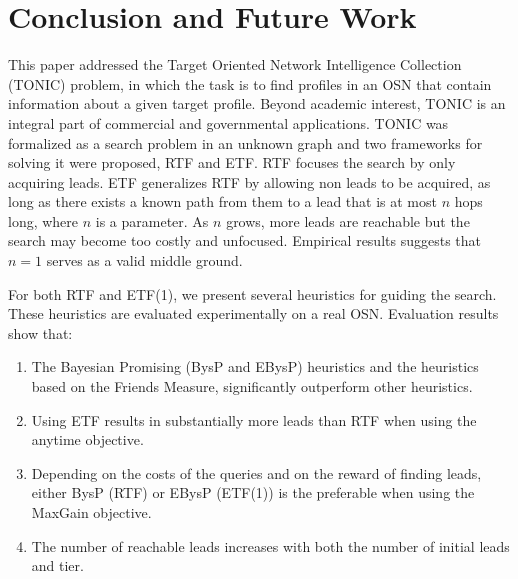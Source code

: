 \documentclass[prodmode,acmtecs]{acmsmall} %
\newcommand{\note}[2]{\textbf{\textsc{#1} says: \textit{#2}}}
\begin{document}
\section{Conclusion and Future Work}
\label{sec:conclusions}


This paper addressed the Target Oriented Network Intelligence Collection (TONIC) problem, in which the task is to find profiles in an OSN that contain information about a given target profile. Beyond academic interest, TONIC is an integral part of commercial and governmental applications.
TONIC was formalized as a search problem in an unknown graph and two frameworks for solving it were proposed, RTF and ETF. RTF focuses the search by only acquiring leads. ETF generalizes RTF by allowing non leads to be acquired, as long as there exists a known path from them to a lead that is at most $n$ hops long, where $n$ is a parameter. As $n$ grows, more leads are reachable but the search may become too costly and unfocused. Empirical results suggests that $n=1$ serves as a valid middle ground.

For both RTF and ETF(1), we present several heuristics for guiding the search. These heuristics are evaluated experimentally on a real OSN. 
Evaluation results show that:

\begin{enumerate}
\item The Bayesian Promising (BysP and EBysP) heuristics and the heuristics based on the Friends Measure, significantly outperform other heuristics.
\item Using ETF results in substantially more leads than RTF when using the anytime objective. 
\item Depending on the costs of the queries and on the reward of finding leads, either BysP (RTF) or EBysP (ETF(1)) is the preferable when using the MaxGain objective.
\item The number of reachable leads increases with both the number of initial leads and tier. 
\end{enumerate}

\end{document}
